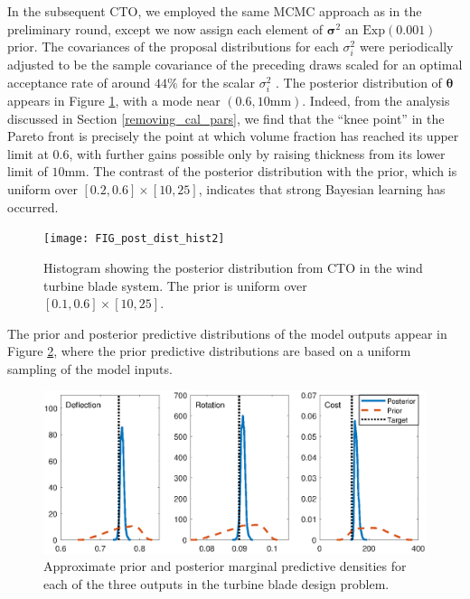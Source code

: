 \documentclass[twocolumn,10pt]{asme2ej}
\begin{document}
%
In the subsequent CTO, we employed the same MCMC approach as in the preliminary round, except we now assign each element of $\boldsymbol\sigma^2$ an $\mathrm{Exp}(0.001)$ prior.
%
The covariances of the proposal distributions for each $\sigma^2_i$ were periodically adjusted to be the sample covariance of the preceding draws scaled for an optimal acceptance rate of around $44\%$ for the scalar $\sigma^2_i$ \cite{Roberts1997,Gelman2013}.
%
The posterior distribution of $\boldsymbol\theta$ appears in Figure \ref{fig:wt_marg_post}, with a mode near $(0.6, 10\mathrm{mm})$.
%
Indeed, from the analysis discussed in Section \ref{removing_cal_pars}, we find that the ``knee point'' in the Pareto front is precisely the point at which volume fraction has reached its upper limit at $0.6$, with further gains possible only by raising thickness from its lower limit of $10$mm.
%
The contrast of the posterior distribution with the prior, which is uniform over $[0.2,0.6]\times[10,25]$, indicates that strong Bayesian learning has occurred.
%
\begin{figure}
	\centering
	\texttt{[image: FIG\_post\_dist\_hist2]}
	\caption{Histogram showing the posterior distribution from CTO in the wind turbine blade system. The prior is uniform over $[0.1,0.6]\times[10,25]$.}
	\label{fig:wt_marg_post}
\end{figure}
%
The prior and posterior predictive distributions of the model outputs appear in Figure \ref{fig:prior_post_pred_comp}, where the prior predictive distributions are based on a uniform sampling of the model inputs.
%
\begin{figure}[h]
	\centering
	\includegraphics[scale=0.85]{FIG_prior_vs_posterior_dist}
	\caption{Approximate prior and posterior marginal predictive densities for each of the three outputs in the turbine blade design problem.}
	\label{fig:prior_post_pred_comp}
\end{figure}
\end{document}
